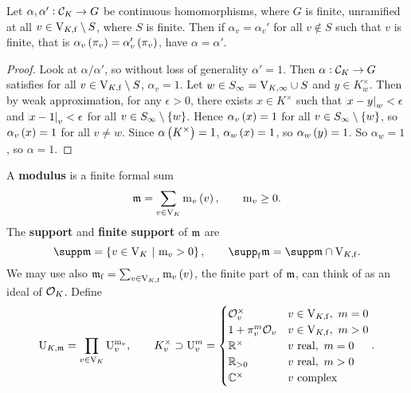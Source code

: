 
\begin{proposition}
\label{prop:8.2}
Let $ \alpha, \alpha' : \mathcal{C}_K \to G $ be continuous homomorphisms, where $ G $ is finite, unramified at all $ v \in \mathrm{V}_{K, \mathrm{f}} \setminus S $, where $ S $ is finite. Then if $ \alpha_v = \alpha_v' $ for all $ v \notin S $ such that $ v $ is finite, that is $ \alpha_v\br{\pi_v} = \alpha_v'\br{\pi_v} $, have $ \alpha = \alpha' $.
\end{proposition}

\begin{proof}
Look at $ \alpha / \alpha' $, so without loss of generality $ \alpha' = 1 $. Then $ \alpha : \mathcal{C}_K \to G $ satisfies for all $ v \in \mathrm{V}_{K, \mathrm{f}} \setminus S $, $ \alpha_v = 1 $. Let $ w \in S_\infty = \mathrm{V}_{K, \infty} \cup S $ and $ y \in K_w^\times $. Then by weak approximation, for any $ \epsilon > 0 $, there exists $ x \in K^\times $ such that $ \abs{x - y}_w < \epsilon $ and $ \abs{x - 1}_v < \epsilon $ for all $ v \in S_\infty \setminus \cbr{w} $. Hence $ \alpha_v\br{x} = 1 $ for all $ v \in S_\infty \setminus \cbr{w} $, so $ \alpha_v\br{x} = 1 $ for all $ v \ne w $. Since $ \alpha\br{K^\times} = 1 $, $ \alpha_w\br{x} = 1 $, so $ \alpha_w\br{y} = 1 $. So $ \alpha_w = 1 $, so $ \alpha = 1 $.
\end{proof}

\pagebreak

\begin{definition*}
A \textbf{modulus} is a finite formal sum
$$ \mmm = \sum_{v \in \V_K} \m_v\br{v}, \qquad \m_v \ge 0. $$
The \textbf{support} and \textbf{finite support} of $ \mathfrak{m} $ are
$$ \supp \mmm = \cbr{v \in \V_K \st \m_v > 0}, \qquad \supp_\f \mmm = \supp \mmm \cap \V_{K, \f}. $$
We may use also $ \mmm_\f = \sum_{v \in \V_{K, \f}} \m_v\br{v} $, the finite part of $ \mathfrak{m} $, can think of as an ideal of $ \mathcal{O}_K $. Define
$$ \mathrm{U}_{K, \mathfrak{m}} = \prod_{v \in \mathrm{V}_K} \mathrm{U}_v^{\mathrm{m}_v}, \qquad K_v^\times \supset \mathrm{U}_v^m =
\begin{cases}
\mathcal{O}_v^\times & v \in \mathrm{V}_{K, \mathrm{f}}, \ m = 0 \\
1 + \pi_v^m\mathcal{O}_v & v \in \mathrm{V}_{K, \mathrm{f}}, \ m > 0 \\
\mathbb{R}^\times & v \ \text{real}, \ m = 0 \\
\mathbb{R}_{> 0} & v \ \text{real}, \ m > 0 \\
\mathbb{C}^\times & v \ \text{complex}
\end{cases}.
$$
\end{definition*}

